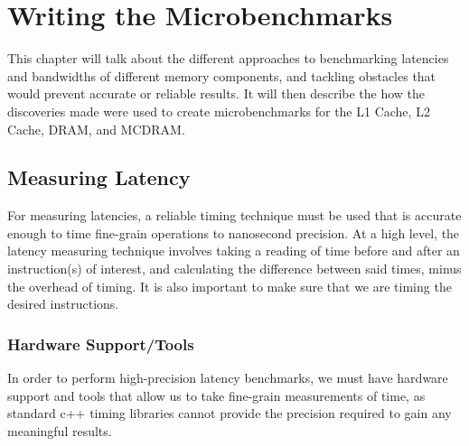 \documentclass[bsc,frontabs,twoside,singlespacing,parskip,deptreport]{infthesis}     %
\begin{document}
\chapter{Writing the Microbenchmarks}\label{chap:writing-benchmarks}
This chapter will talk about the different approaches to benchmarking latencies and bandwidths of different memory components, and tackling obstacles that would prevent accurate or reliable results. It will then describe the how the discoveries made were used to create microbenchmarks for the L1 Cache, L2 Cache, DRAM, and MCDRAM.

\section{Measuring Latency}\label{measuring-latency}
For measuring latencies, a reliable timing technique must be used that is accurate enough to time fine-grain operations to nanosecond precision. At a high level, the latency measuring technique involves taking a reading of time before and after an instruction(s) of interest, and calculating the difference between said times, minus the overhead of timing. It is also important to make sure that we are timing the desired instructions.

\subsection{Hardware Support/Tools}
In order to perform high-precision latency benchmarks, we must have hardware support and tools that allow us to take fine-grain measurements of time, as standard c++ timing libraries cannot provide the precision required to gain any meaningful results.
\end{document}
